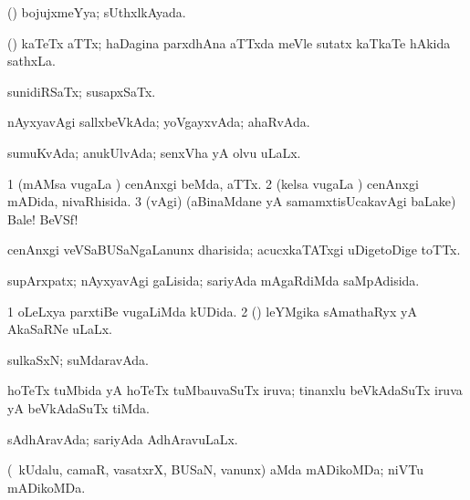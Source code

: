 {{{\bentry
{} 
\gl{\gu}
\expl{}
\bmng
(\AmA) bojujxmeYya; sUthxlkAyada. 
\emng
\eentry

\bentry
{} 
\gl{\nA}
\expl{}
\bmng
(\nw) kaTeTx aTTx; haDagina parxdhAna aTTxda meVle sutatx kaTkaTe hAkida sathxLa. 
\emng
\eentry

\bentry
{} 
\gl{\gu}
\expl{}
\bmng
sunidiRSaTx; susapxSaTx. 
\emng
\eentry

\bentry
{} 
\gl{\gu}
\bmng
nAyxyavAgi sallxbeVkAda; yoVgayxvAda; ahaRvAda. 
\emng
\eentry

\bentry
{} 
\gl{\gu}
\expl{}
\bmng
sumuKvAda; anukUlvAda; senxVha yA olvu uLaLx. 
\emng
\eentry

\bentry
{} 
\gl{\gu}
\expl{}
\bmng
\bnum
\num{1} (mAMsa \mo vugaLa \vi) cenAnxgi beMda, aTTx. 
\num{2} (kelsa \mo vugaLa \vi) cenAnxgi mADida, nivaRhisida. 
\num{3} (\BAavayx vAgi) (aBinaMdane yA samamxtisUcakavAgi baLake) Bale! BeVSf! 
\enum
\emng
\eentry

\bentry
{} 
\gl{\gu}
\expl{}
\bmng
cenAnxgi veVSaBUSaNgaLanunx dharisida; acucxkaTATxgi uDigetoDige toTTx. 
\emng
\eentry

\bentry
{} 
\gl{\gu}
\expl{}
\bmng
supArxpatx; nAyxyavAgi gaLisida; sariyAda mAgaRdiMda saMpAdisida. 
\emng
\eentry

\bentry
{} 
\gl{\gu}
\expl{}
\bmng
\bnum
\num{1} oLeLxya parxtiBe \mo vugaLiMda kUDida. 
\num{2} (\AmA) leYMgika sAmathaRyx yA AkaSaRNe uLaLx. 
\enum
\emng
\eentry

\bentry
{} 
\gl{\gu}
\expl{}
\bmng
sulkaSxN; suMdaravAda. 
\emng
\eentry

\bentry
{} 
\gl{\gu}
\expl{}
\bmng
hoTeTx tuMbida yA hoTeTx tuMbauvaSuTx iruva; tinanxlu beVkAdaSuTx iruva yA beVkAdaSuTx tiMda. 
\emng
\eentry

\bentry
{} 
\gl{\gu}
\expl{}
\bmng
{} 
\emng
\eentry

\bentry
{} 
\gl{\gu}
\expl{}
\bmng
sAdhAravAda; sariyAda AdhAravuLaLx. 
\emng
\eentry

\bentry
{} 
\gl{\gu}
\expl{}
\bmng
(\kanmu\ kUdalu, camaR, vasatxrX, BUSaN, \mo vanunx) aMda mADikoMDa; niVTu mADikoMDa. 
\emng
\eentry

}}}
